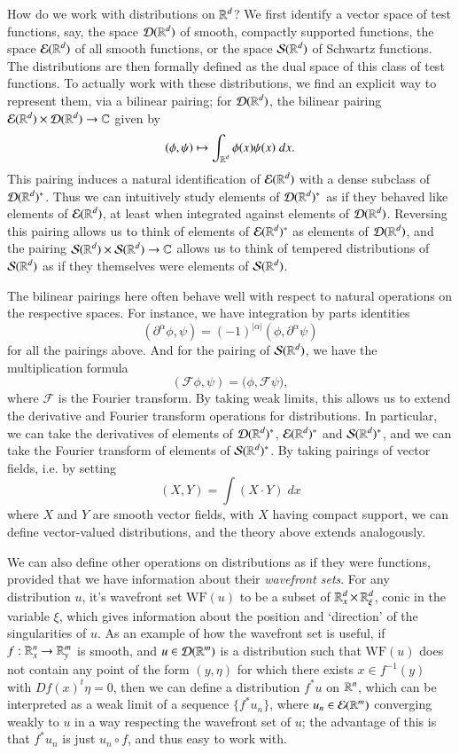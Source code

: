 How do we work with distributions on $\operatorname{\mathbb{R}}^d$? We first identify a vector space of test functions, say, the space $\operatorname{\mathcal{D}}(\operatorname{\mathbb{R}}^d)$ of smooth, compactly supported functions, the space $\operatorname{\mathcal{E}}(\operatorname{\mathbb{R}}^d)$ of all smooth functions, or the space $\operatorname{\mathcal{S}}(\operatorname{\mathbb{R}}^d)$ of Schwartz functions. The distributions are then formally defined as the dual space of this class of test functions. To actually work with these distributions, we find an explicit way to represent them, via a bilinear pairing; for $\operatorname{\mathcal{D}}(\operatorname{\mathbb{R}}^d)$, the bilinear pairing $\operatorname{\mathcal{E}}(\operatorname{\mathbb{R}}^d) \times \operatorname{\mathcal{D}}(\operatorname{\mathbb{R}}^d) \to \operatorname{\mathbb{C}}$ given by
%
\[ (\phi,\psi) \mapsto \int_{\operatorname{\mathbb{R}}^d} \phi(x) \psi(x)\; dx. \]
%
This pairing induces a natural identification of $\operatorname{\mathcal{E}}(\operatorname{\mathbb{R}}^d)$ with a dense subclass of $\operatorname{\mathcal{D}}(\operatorname{\mathbb{R}}^d)^*$. Thus we can intuitively study elements of $\operatorname{\mathcal{D}}(\operatorname{\mathbb{R}}^d)^*$ as if they behaved like elements of $\operatorname{\mathcal{E}}(\operatorname{\mathbb{R}}^d)$, at least when integrated against elements of $\operatorname{\mathcal{D}}(\operatorname{\mathbb{R}}^d)$. Reversing this pairing allows us to think of elements of $\operatorname{\mathcal{E}}(\operatorname{\mathbb{R}}^d)^*$ as elements of $\operatorname{\mathcal{D}}(\operatorname{\mathbb{R}}^d)$, and the pairing $\operatorname{\mathcal{S}}(\operatorname{\mathbb{R}}^d) \times \operatorname{\mathcal{S}}(\operatorname{\mathbb{R}}^d) \to \operatorname{\mathbb{C}}$ allows us to think of tempered distributions of $\operatorname{\mathcal{S}}(\operatorname{\mathbb{R}}^d)$ as if they themselves were elements of $\operatorname{\mathcal{S}}(\operatorname{\mathbb{R}}^d)$.

The bilinear pairings here often behave well with respect to natural operations on the respective spaces. For instance, we have integration by parts identities
%
\[ ( \partial^\alpha \phi, \psi ) = (-1)^{|\alpha|} (\phi, \partial^\alpha \psi) \]
%
for all the pairings above. And for the pairing of $\operatorname{\mathcal{S}}(\operatorname{\mathbb{R}}^d)$, we have the multiplication formula
%
\[ ( \mathcal{F} \phi, \psi ) = \Big( \phi , \mathcal{F} \psi \Big), \]
%
where $\mathcal{F}$ is the Fourier transform. By taking weak limits, this allows us to extend the derivative and Fourier transform operations for distributions. In particular, we can take the derivatives of elements of $\operatorname{\mathcal{D}}(\operatorname{\mathbb{R}}^d)^*$, $\operatorname{\mathcal{E}}(\operatorname{\mathbb{R}}^d)^*$ and $\operatorname{\mathcal{S}}(\operatorname{\mathbb{R}}^d)^*$, and we can take the Fourier transform of elements of $\operatorname{\mathcal{S}}(\operatorname{\mathbb{R}}^d)^*$. By taking pairings of vector fields, i.e. by setting
%
\[ (X, Y) = \int (X \cdot Y)\; dx \]
%
where $X$ and $Y$ are smooth vector fields, with $X$ having compact support, we can define vector-valued distributions, and the theory above extends analogously.

We can also define other operations on distributions as if they were functions, provided that we have information about their \emph{wavefront sets}. For any distribution $u$, it's wavefront set $\text{WF}(u)$ to be a subset of $\operatorname{\mathbb{R}}^d_x \times \operatorname{\mathbb{R}}^d_\xi$, conic in the variable $\xi$, which gives information about the position and `direction' of the singularities of $u$. As an example of how the wavefront set is useful,  if $f: \operatorname{\mathbb{R}}^n_x \to \operatorname{\mathbb{R}}^m_y$ is smooth, and $u \in \operatorname{\mathcal{D}}(\operatorname{\mathbb{R}}^m)$ is a distribution such that $\text{WF}(u)$ does not contain any point of the form $(y,\eta)$ for which there exists $x \in f^{-1}(y)$ with $Df(x)^t \eta = 0$, then we can define a distribution $f^* u$ on $\operatorname{\mathbb{R}}^n$, which can be interpreted as a weak limit of a sequence $\{ f^* u_n \}$, where $u_n \in \operatorname{\mathcal{E}}(\operatorname{\mathbb{R}}^m)$ converging weakly to $u$ in a way respecting the wavefront set of $u$; the advantage of this is that $f^* u_n$ is just $u_n \circ f$, and thus easy to work with.

